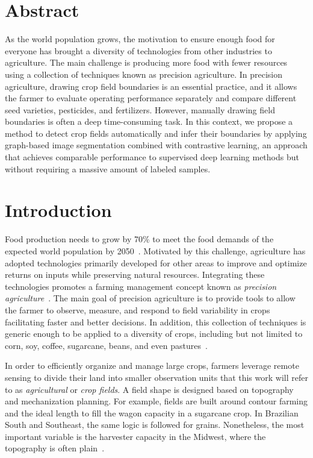 \documentclass[12pt]{article}
\begin{document}
	\newpage
	\baselineskip
	\setcounter{page}{1}

\section*{Abstract}

As the world population grows, the motivation to ensure enough food for everyone has brought a diversity of technologies from other industries to agriculture. The main challenge is producing more food with fewer resources using a collection of techniques known as precision agriculture. In precision agriculture, drawing crop field boundaries is an essential practice, and it allows the farmer to evaluate operating performance separately and compare different seed varieties, pesticides, and fertilizers. However, manually drawing field boundaries is often a deep time-consuming task. In this context, we propose a method to detect crop fields automatically and infer their boundaries by applying graph-based image segmentation combined with contrastive learning, an approach that achieves comparable performance to supervised deep learning methods but without requiring a massive amount of labeled samples.

\section{Introduction}\label{section:introduction}

Food production needs to grow by 70\% to meet the food demands of the expected world population by 2050~\cite{nelson2010}. Motivated by this challenge, agriculture has adopted technologies primarily developed for other areas to improve and optimize returns on inputs while preserving natural resources. Integrating these technologies promotes a farming management concept known as \textit{precision agriculture}~\cite{zhang2002}. The main goal of precision agriculture is to provide tools to allow the farmer to observe, measure, and respond to field variability in crops facilitating faster and better decisions. In addition, this collection of techniques is generic enough to be applied to a diversity of crops, including but not limited to corn, soy, coffee, sugarcane, beans, and even pastures~\cite{mulla2013,bhakta2019}.

In order to efficiently organize and manage large crops, farmers leverage remote sensing to divide their land into smaller observation units that this work will refer to as \textit{agricultural} or \textit{crop fields}. A field shape is designed based on topography and mechanization planning. For example, fields are built around contour farming and the ideal length to fill the wagon capacity in a sugarcane crop. In Brazilian South and Southeast, the same logic is followed for grains. Nonetheless, the most important variable is the harvester capacity in the Midwest, where the topography is often plain~\cite{spekken2015,griffel2019,bolfe2020}.
\end{document}
